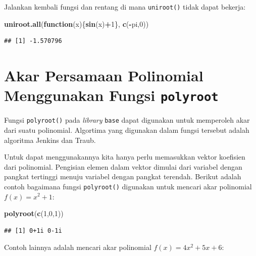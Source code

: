 \documentclass[]{book}
\newenvironment{Shaded}{\begin{snugshade}}{\end{snugshade}}
\newcommand{\ControlFlowTok}[1]{\textcolor[rgb]{0.13,0.29,0.53}{\textbf{#1}}}
\newcommand{\DecValTok}[1]{\textcolor[rgb]{0.00,0.00,0.81}{#1}}
\newcommand{\KeywordTok}[1]{\textcolor[rgb]{0.13,0.29,0.53}{\textbf{#1}}}
\newcommand{\NormalTok}[1]{#1}
\newcommand{\OperatorTok}[1]{\textcolor[rgb]{0.81,0.36,0.00}{\textbf{#1}}}
\theoremstyle{definition}
\theoremstyle{definition}
\theoremstyle{definition}
\theoremstyle{remark}
\begin{document}
Jalankan kembali fungsi dan rentang di mana \texttt{uniroot()} tidak dapat bekerja:

\begin{Shaded}
\begin{Highlighting}[]
\KeywordTok{uniroot.all}\NormalTok{(}\ControlFlowTok{function}\NormalTok{(x)\{}\KeywordTok{sin}\NormalTok{(x)}\OperatorTok{+}\DecValTok{1}\NormalTok{\}, }\KeywordTok{c}\NormalTok{(}\OperatorTok{-}\NormalTok{pi,}\DecValTok{0}\NormalTok{))}
\end{Highlighting}
\end{Shaded}

\begin{verbatim}
## [1] -1.570796
\end{verbatim}

\hypertarget{akar-persamaan-polinomial-menggunakan-fungsi-polyroot}{%
\section{\texorpdfstring{Akar Persamaan Polinomial Menggunakan Fungsi \texttt{polyroot}}{Akar Persamaan Polinomial Menggunakan Fungsi polyroot}}\label{akar-persamaan-polinomial-menggunakan-fungsi-polyroot}}

Fungsi \texttt{polyroot()} pada \emph{library} \texttt{base} dapat digunakan untuk memperoleh akar dari suatu polinomial. Algortima yang digunakan dalam fungsi tersebut adalah algoritma Jenkins dan Traub.

Untuk dapat menggunakannya kita hanya perlu memasukkan vektor koefisien dari polinomial. Pengisian elemen dalam vektor dimulai dari variabel dengan pangkat tertinggi menuju variabel dengan pangkat terendah. Berikut adalah contoh bagaimana fungsi \texttt{polyroot()} digunakan untuk mencari akar polinomial \(f\left(x\right)=x^2+1\):

\begin{Shaded}
\begin{Highlighting}[]
\KeywordTok{polyroot}\NormalTok{(}\KeywordTok{c}\NormalTok{(}\DecValTok{1}\NormalTok{,}\DecValTok{0}\NormalTok{,}\DecValTok{1}\NormalTok{))}
\end{Highlighting}
\end{Shaded}

\begin{verbatim}
## [1] 0+1i 0-1i
\end{verbatim}

Contoh lainnya adalah mencari akar polinomial \(f\left(x\right)=4x^2+5x+6\):
\end{document}
